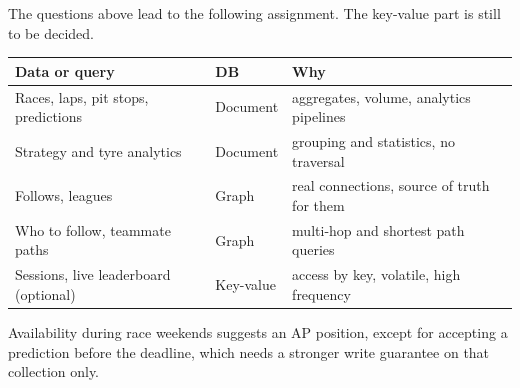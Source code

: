 \begin{example}
The questions above lead to the following assignment. The key-value part is still to be decided.
\begin{center}\footnotesize
\begin{tabular}{p{4.9cm}p{1.8cm}p{6.1cm}}
\toprule
\textbf{Data or query} & \textbf{DB} & \textbf{Why} \\
\midrule
Races, laps, pit stops, predictions & Document & aggregates, volume, analytics pipelines \\
Strategy and tyre analytics & Document & grouping and statistics, no traversal \\
Follows, leagues & Graph & real connections, source of truth for them \\
Who to follow, teammate paths & Graph & multi-hop and shortest path queries \\
Sessions, live leaderboard (optional) & Key-value & access by key, volatile, high frequency \\
\bottomrule
\end{tabular}
\end{center}
Availability during race weekends suggests an AP position, except for accepting a prediction before the deadline, which needs a stronger write guarantee on that collection only.
\end{example}
